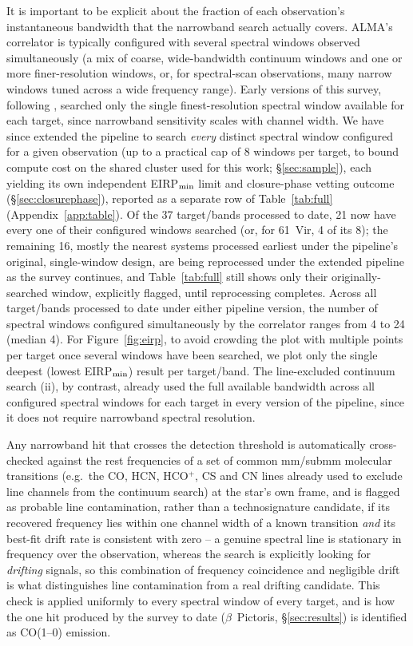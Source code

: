 \documentclass{openjournal}
\begin{document}
It is important to be explicit about the fraction of each observation's
instantaneous bandwidth that the narrowband search actually covers.
ALMA's correlator is typically configured with several spectral windows
observed simultaneously (a mix of coarse, wide-bandwidth continuum
windows and one or more finer-resolution windows, or, for spectral-scan
observations, many narrow windows tuned across a wide frequency range).
Early versions of this survey, following \citet{Mason2024}, searched
only the single finest-resolution spectral window available for each
target, since narrowband sensitivity scales with channel width. We have
since extended the pipeline to search \emph{every} distinct spectral
window configured for a given observation (up to a practical cap of 8
windows per target, to bound compute cost on the shared cluster used for
this work; \S\ref{sec:sample}), each yielding its own independent
EIRP$_{\rm min}$ limit and closure-phase vetting outcome
(\S\ref{sec:closurephase}), reported as a separate row of
Table~\ref{tab:full} (Appendix~\ref{app:table}). Of the 37 target/bands
processed to date, 21 now have every one of their configured windows
searched (or, for 61~Vir, 4 of its 8); the remaining 16, mostly the
nearest systems processed earliest under the pipeline's original,
single-window design, are being reprocessed under the extended pipeline
as the survey continues, and Table~\ref{tab:full} still shows only their
originally-searched window, explicitly flagged, until reprocessing
completes. Across all target/bands
processed to date under either pipeline version, the number of spectral
windows configured simultaneously by the correlator ranges from 4 to 24
(median 4). For Figure~\ref{fig:eirp}, to avoid crowding the plot with
multiple points per target once several windows have been searched, we
plot only the single deepest (lowest EIRP$_{\rm min}$) result per
target/band. The line-excluded continuum search (ii), by contrast,
already used the full available bandwidth across all configured spectral
windows for each target in every version of the pipeline, since it does
not require narrowband spectral resolution.

Any narrowband hit that crosses the detection threshold is automatically
cross-checked against the rest frequencies of a set of common mm/submm
molecular transitions (e.g.\ the CO, HCN, HCO$^{+}$, CS and CN lines
already used to exclude line channels from the continuum search) at the
star's own frame, and is flagged as probable line contamination, rather
than a technosignature candidate, if its recovered frequency lies within
one channel width of a known transition \emph{and} its best-fit drift
rate is consistent with zero -- a genuine spectral line is stationary in
frequency over the observation, whereas the search is explicitly looking
for \emph{drifting} signals, so this combination of frequency
coincidence and negligible drift is what distinguishes line
contamination from a real drifting candidate. This check is applied
uniformly to every spectral window of every target, and is how the one
hit produced by the survey to date ($\beta$~Pictoris, \S\ref{sec:results})
is identified as CO(1--0) emission.
\end{document}
